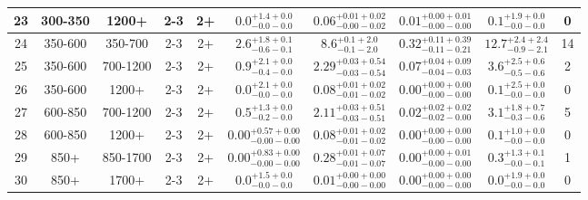 \documentclass[11pt, oneside]{article}
\begin{document}
\begin{table}
{\begin{tabular}{ |c|c|c|c|c||c|c|c||c|c| }
23 & 300-350 & 1200+ & 2-3 & 2+ & $0.0^{+1.4+0.0}_{-0.0-0.0}$ & $0.06^{+0.01+0.02}_{-0.00-0.02}$ & $0.01^{+0.00+0.01}_{-0.00-0.00}$ & $0.1^{+1.9+0.0}_{-0.0-0.0}$ & 0 \\ \hline
24 & 350-600 & 350-700 & 2-3 & 2+ & $2.6^{+1.8+0.1}_{-0.6-0.1}$ & $8.6^{+0.1+2.0}_{-0.1-2.0}$ & $0.32^{+0.11+0.39}_{-0.11-0.21}$ & $12.7^{+2.4+2.4}_{-0.9-2.1}$ & 14 \\ \hline
25 & 350-600 & 700-1200 & 2-3 & 2+ & $0.9^{+2.1+0.0}_{-0.4-0.0}$ & $2.29^{+0.03+0.54}_{-0.03-0.54}$ & $0.07^{+0.04+0.09}_{-0.04-0.03}$ & $3.6^{+2.5+0.6}_{-0.5-0.6}$ & 2 \\ \hline
26 & 350-600 & 1200+ & 2-3 & 2+ & $0.0^{+2.1+0.0}_{-0.0-0.0}$ & $0.08^{+0.01+0.02}_{-0.01-0.02}$ & $0.00^{+0.00+0.00}_{-0.00-0.00}$ & $0.1^{+2.5+0.0}_{-0.0-0.0}$ & 0 \\ \hline
27 & 600-850 & 700-1200 & 2-3 & 2+ & $0.5^{+1.3+0.0}_{-0.2-0.0}$ & $2.11^{+0.03+0.51}_{-0.03-0.51}$ & $0.02^{+0.02+0.02}_{-0.02-0.00}$ & $3.1^{+1.8+0.7}_{-0.3-0.6}$ & 5 \\ \hline
28 & 600-850 & 1200+ & 2-3 & 2+ & $0.00^{+0.57+0.00}_{-0.00-0.00}$ & $0.08^{+0.01+0.02}_{-0.01-0.02}$ & $0.00^{+0.00+0.00}_{-0.00-0.00}$ & $0.1^{+1.0+0.0}_{-0.0-0.0}$ & 0 \\ \hline
29 & 850+ & 850-1700 & 2-3 & 2+ & $0.00^{+0.83+0.00}_{-0.00-0.00}$ & $0.28^{+0.01+0.07}_{-0.01-0.07}$ & $0.00^{+0.00+0.01}_{-0.00-0.00}$ & $0.3^{+1.3+0.1}_{-0.0-0.1}$ & 1 \\ \hline
30 & 850+ & 1700+ & 2-3 & 2+ & $0.0^{+1.5+0.0}_{-0.0-0.0}$ & $0.01^{+0.00+0.00}_{-0.00-0.00}$ & $0.00^{+0.00+0.00}_{-0.00-0.00}$ & $0.0^{+1.9+0.0}_{-0.0-0.0}$ & 0 \\ \hline
\end{tabular}}
\end{table}
\end{document}
